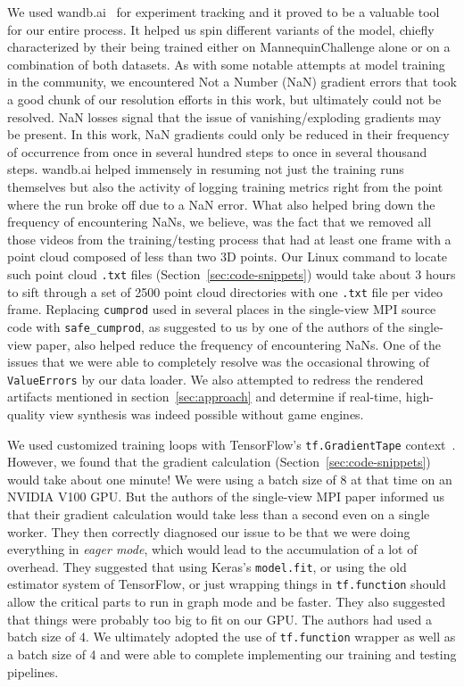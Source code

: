 We used wandb.ai~\cite{wandb} for experiment tracking and it proved to be a valuable tool for our entire process. It helped us spin different variants of the model, chiefly characterized by their being trained either on MannequinChallenge alone or on a combination of both datasets. As with some notable attempts at model training in the community, we encountered Not a Number (NaN) gradient errors that took a good chunk of our resolution efforts in this work, but ultimately could not be resolved. NaN losses signal that the issue of vanishing/exploding gradients may be present. In this work, NaN gradients could only be reduced in their frequency of occurrence from once in several hundred steps to once in several thousand steps. wandb.ai helped immensely in resuming not just the training runs themselves but also the activity of logging training metrics right from the point where the run broke off due to a NaN error. What also helped bring down the frequency of encountering NaNs, we believe, was the fact that we removed all those videos from the training/testing process that had at least one frame with a point cloud composed of less than two 3D points. Our Linux command to locate such point cloud \texttt{.txt} files (Section~\ref{sec:code-snippets}) would take about 3 hours to sift through a set of 2500 point cloud directories with one \texttt{.txt} file per video frame. Replacing \texttt{cumprod} used in several places in the single-view MPI source code with \texttt{safe\_cumprod}, as suggested to us by one of the authors of the single-view paper, also helped reduce the frequency of encountering NaNs. One of the issues that we were able to completely resolve was the occasional throwing of \texttt{ValueErrors} by our data loader. We also attempted to redress the rendered artifacts mentioned in section~\ref{sec:approach} and determine if real-time, high-quality view synthesis was indeed possible without game engines.

We used customized training loops with TensorFlow's \texttt{tf.GradientTape} context~\cite{noauthor_custom_nodate}. However, we found that the gradient calculation (Section~\ref{sec:code-snippets}) would take about one minute! We were using a batch size of 8 at that time on an NVIDIA V100 GPU. But the authors of the single-view MPI paper informed us that their gradient calculation would take less than a second even on a single worker. They then correctly diagnosed our issue to be that we were doing everything in \textit{eager mode}, which would lead to the accumulation of a lot of overhead. They suggested that using Keras's \texttt{model.fit}, or using the old estimator system of TensorFlow, or just wrapping things in \texttt{tf.function} should allow the critical parts to run in graph mode and be faster. They also suggested that things were probably too big to fit on our GPU. The authors had used a batch size of 4. We ultimately adopted the use of \texttt{tf.function} wrapper as well as a batch size of 4 and were able to complete implementing our training and testing pipelines.

